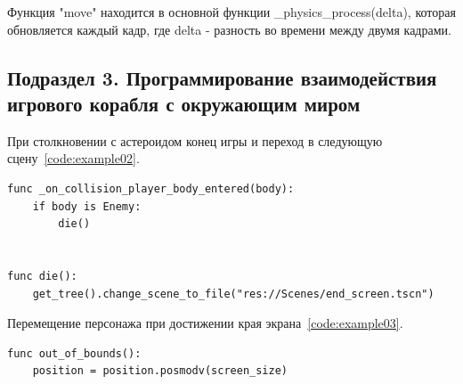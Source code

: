 Функция "move" находится в основной функции \_physics\_process(delta), которая обновляется каждый кадр, где delta - разность во времени между двумя кадрами.

\subsection{\label{subsec:ch02/sec01/sub03}Подраздел 3. Программирование взаимодействия игрового корабля с окружающим миром}

При столкновении с астероидом конец игры и переход в следующую сцену~\ref{code:example02}.
\begin{code}
\vspace{-\baselineskip}\begin{verbatim}
func _on_collision_player_body_entered(body):
    if body is Enemy:
        die()


func die():
    get_tree().change_scene_to_file("res://Scenes/end_screen.tscn")
\end{verbatim}
\end{code}


Перемещение персонажа при достижении края экрана~\ref{code:example03}.
\begin{code}
\vspace{-\baselineskip}\begin{verbatim}
func out_of_bounds():
    position = position.posmodv(screen_size)
\end{verbatim}
\end{code}


